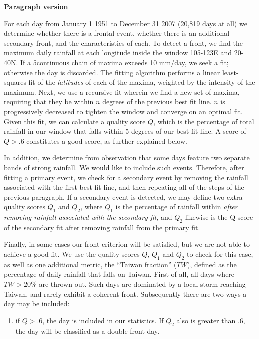 \documentclass[draft,grl]{AGUTeX}
\begin{document}
\begin{article}
	\textbf{Paragraph version}

	For each day from January 1 1951 to December 31 2007 (20,819 days at all) we determine whether there is a frontal event, whether there is an additional secondary front, and the characteristics of each. To detect a front, we find the maximum daily rainfall at each longitude inside the window 105-123\textdegree E and 20-40\textdegree N. If a 5\textdegree continuous chain of maxima exceeds 10 mm/day, we seek a fit; otherwise the day is discarded. The fitting algorithm performs a linear least-squares fit of the \textit{latitudes} of each of the maxima, weighted by the intensity of the maximum. Next, we use a recursive fit wherein we find a new set of maxima, requiring that they be within $n$ degrees of the previous best fit line. $n$ is progressively decreased to tighten the window and converge on an optimal fit. Given this fit, we can calculate a quality score $Q$, which is the percentage of total rainfall in our window that falls within 5 degrees of our best fit line. A score of $Q > .6$ constitutes a good score, as further explained below.
	
	In addition, we determine from observation that some days feature two separate bands of strong rainfall. We would like to include such events. Therefore, after fitting a primary event, we check for a secondary event by removing the rainfall associated with the first best fit line, and then repeating all of the steps of the previous paragraph. If a secondary event is detected, we may define two extra quality scores $Q_1$ and $Q_2$, where $Q_1$ is the percentage of rainfall within \textit{after removing rainfall associated with the secondary fit}, and $Q_2$ likewise is the Q score of the secondary fit after removing rainfall from the primary fit.
	
	Finally, in some cases our front criterion will be satisfied, but we are not able to achieve a good fit. We use the quality scores $Q$, $Q_1$ and $Q_2$ to check for this case, as well as one additional metric, the ``Taiwan fraction'' ($TW$), defined as the percentage of daily rainfall that falls on Taiwan. First of all, all days where $TW > 20\%$ are thrown out. Such days are dominated by a local storm reaching Taiwan, and rarely exhibit a coherent front. Subsequently there are two ways a day may be included: 
	
	\begin{enumerate}
		\item if $Q>.6$, the day is included in our statistics. If $Q_2$ also is greater than .6, the day will be classified as a double front day.
		

\end{enumerate}
\end{article}
\end{document}
